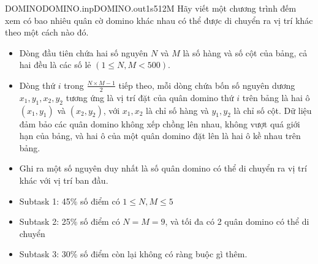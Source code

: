\begin{problem}{DOMINO}{DOMINO.inp}{DOMINO.out}{1s}{512M}
Hãy viết một chương trình đếm xem có bao nhiêu quân cờ domino khác nhau có thể được di chuyển ra vị trí khác theo một cách nào đó.

\InputFile
\begin{itemize}
    \item Dòng đầu tiên chứa hai số nguyên $N$ và $M$ là số hàng và số cột của bảng, cả hai đều là các số lẻ $(1 \le N, M < 500)$.
    \item Dòng thứ $i$ trong $\frac{N \times M - 1}{2}$ tiếp theo, mỗi dòng chứa bốn số nguyên dương $x_1, y_1, x_2, y_2$ tương ứng là vị trí đặt của quân domino thứ $i$ trên bảng là hai ô $(x_1, y_1)$ và $(x_2, y_2)$, với $x_1, x_2$ là chỉ số hàng và $y_1, y_2$ là chỉ số cột. Dữ liệu đảm bảo các quân domino không xếp chồng lên nhau, không vượt quá giới hạn của bảng, và hai ô của một quân domino đặt lên là hai ô kề nhau trên bảng. 
\end{itemize}
\OutputFile
\begin{itemize}
    \item Ghi ra một số nguyên duy nhất là số quân domino có thể di chuyển ra vị trí khác với vị trí ban đầu.
\end{itemize}

\Examples

\begin{example}%
%
\end{example}
\Scoring
\begin{itemize}
    \item Subtask 1: 45\% số điểm có $1 \le N, M \le 5$
    \item Subtask 2: 25\% số điểm có $N = M = 9$, và tối đa có 2 quân domino có thể di chuyển
    \item Subtask 3: 30\% số điểm còn lại không có ràng buộc gì thêm.
\end{itemize}
\end{problem}